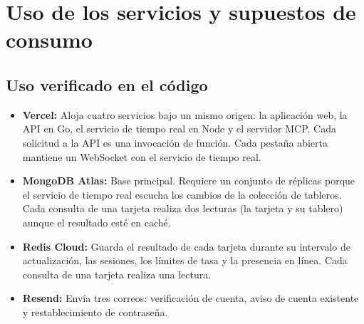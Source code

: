 \section{Uso de los servicios y supuestos de consumo}

\subsection{Uso verificado en el código}
\begin{itemize}
  \item \textbf{Vercel:} Aloja cuatro servicios bajo un mismo origen: la aplicación web, la API en Go, el servicio de tiempo real en Node y el servidor MCP. Cada solicitud a la API es una invocación de función. Cada pestaña abierta mantiene un WebSocket con el servicio de tiempo real.
  \item \textbf{MongoDB Atlas:} Base principal. Requiere un conjunto de réplicas porque el servicio de tiempo real escucha los cambios de la colección de tableros. Cada consulta de una tarjeta realiza dos lecturas (la tarjeta y su tablero) aunque el resultado esté en caché.
  \item \textbf{Redis Cloud:} Guarda el resultado de cada tarjeta durante su intervalo de actualización, las sesiones, los límites de tasa y la presencia en línea. Cada consulta de una tarjeta realiza una lectura.
  \item \textbf{Resend:} Envía tres correos: verificación de cuenta, aviso de cuenta existente y restablecimiento de contraseña.
\end{itemize}

